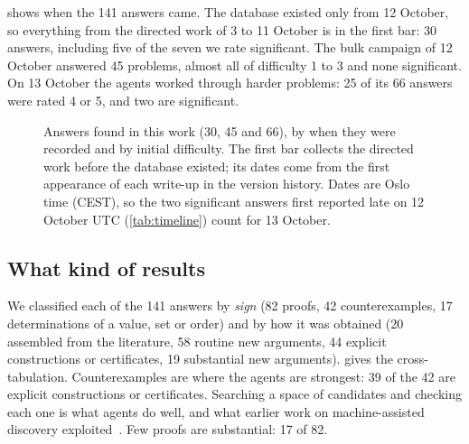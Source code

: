 \documentclass[11pt]{amsart}
\begin{document}
 shows when the 141 answers came. The database existed only
from 12 October, so everything from the directed work of 3 to 11 October is in
the first bar: 30 answers, including five of the seven we rate significant. The
bulk campaign of 12 October answered 45 problems, almost all of difficulty 1 to
3 and none significant. On 13 October the agents worked through harder
problems: 25 of its 66 answers were rated 4 or 5, and two are significant.

\begin{figure}[ht]
  \centering
  \caption{Answers found in this work (30, 45 and 66), by when they were
    recorded and by initial difficulty. The first bar collects the directed
    work before the database existed; its dates come from the first
    appearance of each write-up in the version history. Dates are Oslo time
    (CEST), so the two significant answers first reported late on 12 October
    UTC (\cref{tab:timeline}) count for 13 October.}\label{fig:daily}
\end{figure}

\subsection{What kind of results}
We classified each of the 141 answers by \emph{sign} (82 proofs, 42
counterexamples, 17 determinations of a value, set or order) and by how it was
obtained (20 assembled from the literature, 58 routine new arguments, 44
explicit constructions or certificates, 19 substantial new arguments).
 gives the cross-tabulation. Counterexamples are where the
agents are strongest: 39 of the 42 are explicit constructions or certificates.
Searching a space of candidates and checking each one is what agents do well,
and what earlier work on machine-assisted discovery
exploited~\cites{wagner,funsearch,alphaevolve}. Few proofs are substantial: 17
of 82.
\end{document}
